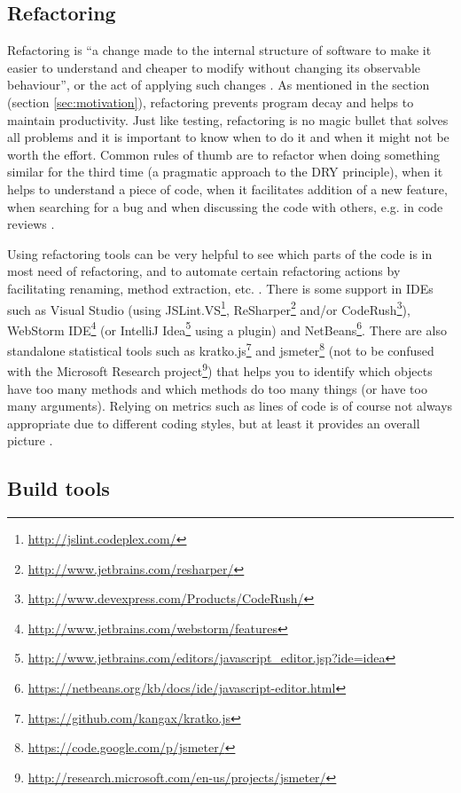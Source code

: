 \documentclass[11pt]{article}
\begin{document}
\subsection{Refactoring}
\label{sec:refactor}

Refactoring is ``a change made to the internal structure of software to make it easier to understand and cheaper to modify without changing its observable behaviour'', or the act of applying such changes \cite[p.~46]{Refactoring}. As mentioned in the  section (section \ref{sec:motivation}), refactoring prevents program decay and helps to maintain productivity. Just like testing, refactoring is no magic bullet that solves all problems and it is important to know when to do it and when it might not be worth the effort. Common rules of thumb are to refactor when doing something similar for the third time (a pragmatic approach to the DRY principle), when it helps to understand a piece of code, when it facilitates addition of a new feature, when searching for a bug and when discussing the code with others, e.g. in code reviews \cite[p.~49-51]{Refactoring}.

Using refactoring tools can be very helpful to see which parts of the code is in most need of refactoring, and to automate certain refactoring actions by facilitating renaming, method extraction, etc. \cite[ch.~5]{Legacy}. There is some support in IDEs such as Visual Studio (using
JSLint.VS\footnote{\url{http://jslint.codeplex.com/}},
ReSharper\footnote{\url{http://www.jetbrains.com/resharper/}} and/or
CodeRush\footnote{\url{http://www.devexpress.com/Products/CodeRush/}}),
WebStorm IDE\footnote{\url{http://www.jetbrains.com/webstorm/features}} (or
IntelliJ Idea\footnote{\url{http://www.jetbrains.com/editors/javascript_editor.jsp?ide=idea}} using a plugin) and
NetBeans\footnote{\url{https://netbeans.org/kb/docs/ide/javascript-editor.html}}. There are also standalone statistical tools such as
kratko.js\footnote{\url{https://github.com/kangax/kratko.js}} and
jsmeter\footnote{\url{https://code.google.com/p/jsmeter/}} (not to be confused with the
Microsoft Research project\footnote{\url{http://research.microsoft.com/en-us/projects/jsmeter/}}) that helps you to identify which objects have too many methods and which methods do too many things (or have too many arguments). Relying on metrics such as lines of code is of course not always appropriate due to different coding styles, but at least it provides an overall picture \cite{Kratko}.

\subsection{Build tools}
\label{sec:build}
\end{document}
